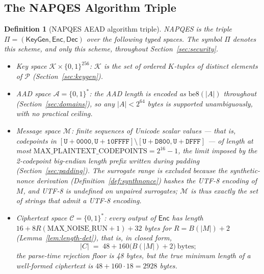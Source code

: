 \documentclass[11pt,a4paper]{article}
\newtheorem{definition}[theorem]{Definition}
\begin{document}
\subsection{The NAPQES Algorithm Triple}
\label{sec:algorithm-triple}

\begin{definition}[NAPQES AEAD algorithm triple]\label{def:aead-triple}
NAPQES is the triple $\Pi = (\mathsf{KeyGen}, \mathsf{Enc}, \mathsf{Dec})$ over
the following typed spaces. The symbol $\Pi$ denotes this scheme, and only
this scheme, throughout Section~\ref{sec:security}.
\begin{itemize}
  \item Key space $\mathcal{K}\times\{0,1\}^{256}$: $\mathcal{K}$ is the set
        of ordered $K$-tuples of distinct elements of $\mathcal{P}$
        (Section~\ref{sec:keygen}).
  \item AAD space $\mathcal{A} = \{0,1\}^{*}$: the AAD length is encoded
        as $\mathrm{be8}(|A|)$ throughout (Section~\ref{sec:domains}), so
        any $|A|<2^{64}$ bytes is supported unambiguously, with no
        practical ceiling.
  \item Message space $\mathcal{M}$: finite sequences of Unicode
        \emph{scalar values} — that is, codepoints in
        $[\mathtt{U+0000},\mathtt{U+10FFFF}]\setminus[\mathtt{U+D800},\mathtt{U+DFFF}]$
        — of length at most
        $\mathrm{MAX\_PLAINTEXT\_CODEPOINTS}=2^{16}-1$, the
        limit imposed by the 2-codepoint big-endian length prefix written
        during padding (Section~\ref{sec:padding}). The surrogate range is
        excluded because the synthetic-nonce derivation
        (Definition~\ref{def:synthnonce}) hashes the UTF-8 encoding of $M$,
        and UTF-8 is undefined on unpaired surrogates; $\mathcal{M}$ is thus
        exactly the set of strings that admit a UTF-8 encoding.
  \item Ciphertext space $\mathcal{C}=\{0,1\}^{*}$: every output of
        $\mathsf{Enc}$ has length $16+8R(\mathrm{MAX\_NOISE\_RUN}+1)+32$
        bytes for $R=B(|M|)+2$ (Lemma~\ref{lem:length-det}), that is, in
        closed form,
        \[
          |C| \;=\; 48 + 160\bigl(B(|M|)+2\bigr)\ \text{bytes};
        \]
        the parse-time
        rejection floor is 48 bytes, but the true minimum length of a
        well-formed ciphertext is $48+160\cdot18=2928$ bytes.
\end{itemize}


\end{definition}
\end{document}
